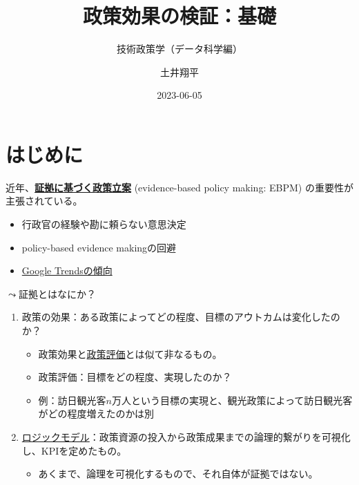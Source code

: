 \documentclass[
  xelatex,
  ja=standard]{bxjsarticle}
\title{政策効果の検証：基礎}
\subtitle{技術政策学（データ科学編）}
\author{土井翔平}
\date{2023-06-05}
\providecommand{\tightlist}{%
  \setlength{\itemsep}{0pt}\setlength{\parskip}{0pt}}\usepackage{longtable,booktabs,array}
\begin{document}
\maketitle
\ifdefined\Shaded\renewenvironment{Shaded}{\begin{tcolorbox}[enhanced, boxrule=0pt, interior hidden, borderline west={3pt}{0pt}{shadecolor}, sharp corners, breakable, frame hidden]}{\end{tcolorbox}}\fi

\hypertarget{ux306fux3058ux3081ux306b}{%
\section*{はじめに}\label{ux306fux3058ux3081ux306b}}

近年、\href{https://www.cao.go.jp/others/kichou/ebpm/ebpm.html}{\textbf{証拠に基づく政策立案}}
(evidence-based policy making: EBPM) の重要性が主張されている。

\begin{itemize}
\tightlist
\item
  行政官の経験や勘に頼らない意思決定
\item
  policy-based evidence makingの回避
\item
  \href{https://trends.google.co.jp/trends/explore?date=today\%205-y\&geo=JP\&q=EBPM\&hl=ja}{Google
  Trendsの傾向}
\end{itemize}

\(\leadsto\)証拠とはなにか？

\begin{enumerate}
\def\labelenumi{\arabic{enumi}.}
\tightlist
\item
  政策の効果：ある政策によってどの程度、目標のアウトカムは変化したのか？

  \begin{itemize}
  \tightlist
  \item
    政策効果と\href{https://www.soumu.go.jp/main_sosiki/hyouka/seisaku_n/portal/index.html}{政策評価}とは似て非なるもの。
  \item
    政策評価：目標をどの程度、実現したのか？
  \item
    例：訪日観光客\(n\)万人という目標の実現と、観光政策によって訪日観光客がどの程度増えたのかは別
  \end{itemize}
\item
  \href{https://www.digital.go.jp/assets/contents/node/basic_page/field_ref_resources/5535bc46-b873-42a7-99d6-bb0b70e2470d/20211104_meeting_EBPM_17.pdf}{ロジックモデル}：政策資源の投入から政策成果までの論理的繋がりを可視化し、KPIを定めたもの。

  \begin{itemize}
  \tightlist
  \item
    あくまで、論理を可視化するもので、それ自体が証拠ではない。
  \end{itemize}
\end{enumerate}
\end{document}

